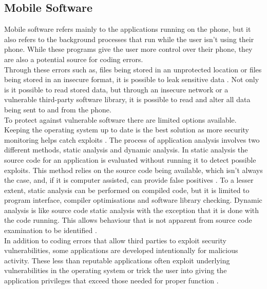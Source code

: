 
\subsection{Mobile Software}

\label{Ch2 Sec2 Sub2}

Mobile software refers mainly to the applications running on the phone, but it  also refers to the background processes that run while the user isn't using their phone.
While these programs give the user more control over their phone, they are also a potential source for coding errors.\\ 
Through these errors such as, files being stored in an unprotected location or files being stored in an insecure format, it is possible to leak sensitive data \cite{Reference14}.
Not only is it possible to read stored data, but through an insecure network or a vulnerable third-party software library, it is possible to read and alter all data being sent to and from the phone.\\ 
To protect against vulnerable software there are limited options available.
Keeping the operating system up to date is the best solution as more security monitoring helps catch exploits \cite{Reference12}.
The process of application analysis involves two different methods, static analysis and dynamic analysis.
In static analysis the source code for an application is evaluated without running it to detect possible exploits.
This method relies on the source code being available, which isn’t always the case, and, if it is computer assisted, can provide false positives \cite{Reference15}.
To a lesser extent, static analysis can be performed on compiled code, but it is limited to program interface, compiler optimisations and software library checking.
Dynamic analysis is like source code static analysis with the exception that it is done with the code running.
This allows behaviour that is not apparent from source code examination to be identified \cite{Reference13}.\\
In addition to coding errors that allow third parties to exploit security vulnerabilities, some applications are developed intentionally for malicious activity.
These less than reputable applications often exploit underlying vulnerabilities in the operating system or trick the user into giving the application privileges that exceed those needed for proper function \cite{Reference16}.\\
